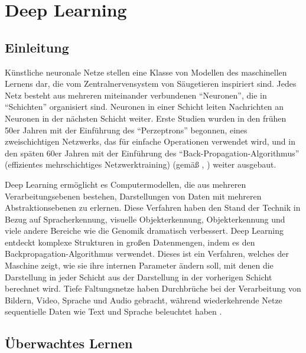\chapter{Deep Learning}
\section{Einleitung}
Künstliche neuronale Netze stellen eine Klasse von Modellen des maschinellen Lernens dar, die vom Zentralnervensystem von Säugetieren inspiriert sind. Jedes Netz besteht aus mehreren miteinander verbundenen \enquote{Neuronen}, die in \enquote{Schichten} organisiert sind. Neuronen in einer Schicht leiten Nachrichten an Neuronen in der nächsten Schicht weiter. Erste Studien wurden in den frühen 50er Jahren mit der Einführung des \enquote{Perzeptrons} \cite{Rosenblatt} begonnen, eines zweischichtigen Netzwerks, das für einfache Operationen verwendet wird, und in den späten 60er Jahren mit der Einführung des \enquote{Back-Propagation-Algorithmus} (effizientes mehrschichtiges Netzwerktraining) (gemäß \cite{Werbos1990}, \cite{Hinton}) weiter ausgebaut.

Deep Learning ermöglicht es Computermodellen, die aus mehreren Verarbeitungsebenen bestehen, Darstellungen von Daten mit mehreren Abstraktionsebenen zu erlernen. Diese Verfahren haben den Stand der Technik in Bezug auf Spracherkennung, visuelle Objekterkennung, Objekterkennung und viele andere Bereiche wie die Genomik dramatisch verbessert. Deep Learning entdeckt komplexe Strukturen in großen Datenmengen, indem es den Backpropagation-Algorithmus verwendet. Dieses ist ein Verfahren, welches der Maschine zeigt, wie sie ihre internen Parameter ändern soll, mit denen die Darstellung in jeder Schicht aus der Darstellung in der vorherigen Schicht berechnet wird. Tiefe Faltungsnetze haben Durchbrüche bei der Verarbeitung von Bildern, Video, Sprache und Audio gebracht, während wiederkehrende Netze sequentielle Daten wie Text und Sprache beleuchtet haben \cite*{Lecun2015}.


\section{Überwachtes Lernen}


